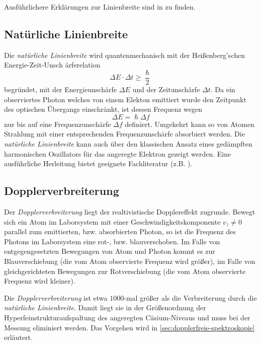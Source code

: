 \documentclass[../bericht.tex]{subfiles}
\begin{document}
      Ausführlichere Erklärungen zur Linienbreite sind in \cite{dem:exp3-linienbreite} zu finden.

      \subsection{Nat\"urliche Linienbreite}
      \label{subsec:natuerliche-linienbreite}

        Die \textit{nat\"urliche Linienbreite} wird quantenmechanisch mit der Hei\ss{}enberg'schen Energie-Zeit-Unsch \"arferelation
        \begin{equation*}
          \Delta E \cdot \Delta t \ge \frac{\hslash}{2}
        \end{equation*}
        begr\"undet, mit der Energieunsch\"arfe $\Delta E$ und der Zeitunsch\"arfe $\Delta t$. Da ein observiertes Photon welches von einem Elekton emittiert wurde den Zeitpunkt des optischen \"Ubergangs einschr\"ankt, ist dessen Frequenz wegen
        \begin{equation*}
          \Delta E = \hslash \Delta f
        \end{equation*}
        nur bis auf eine Frequenzunsch\"arfe $\Delta f$ definiert. Umgekehrt kann so von Atomen Strahlung mit einer entsprechenden Frequenzunsch\"arfe absorbiert werden. Die \textit{nat\"urliche Linienbreite} kann auch \"uber den klassischen Ansatz eines ged\"ampften harmonischen Oszillators f\"ur das angeregte Elektron gezeigt werden. Eine ausf\"uhrliche Herleitung bietet geeignete Fachliteratur (z.B. \cite{dem:exp3-linienbreite}).


      \subsection{Dopplerverbreiterung}
      \label{subsec:dopplerverbreiterung}

        Der \textit{Dopplerverbreiterung} liegt der realtivistische Dopplereffekt zugrunde. Bewegt sich ein Atom im Laborsystem mit einer Geschwindigkeitskomponente $v_z\ne 0$ parallel zum emittierten, bzw. absorbierten Photon, so ist die Frequenz des Photons im Laborsystem eine rot-, bzw. blauverschoben. Im Falle von entgegengesetzten Bewegungen von Atom und Photon kommt es zur Blauverschiebung (die vom Atom observierte Frequenz wird gr\"o\ss{}er), im Falle von gleichgerichteten Bewegungen zur Rotverschiebung (die vom Atom observierte Frequenz wird kleiner).

        Die \textit{Dopplerverbreiterung} ist etwa $1000$-mal gr\"o\ss{}er als die Verbreiterung durch die \textit{nat\"urliche Linienbreite}. Damit liegt sie in der Gr\"o\ss{}enordnung der Hyperfeinstrukturaufspaltung des angeregten C\"asium-Niveaus und muss bei der Messung eliminiert werden. Das Vorgehen wird in \cref{sec:dopplerfreie-spektroskopie} erl\"autert.
\end{document}
